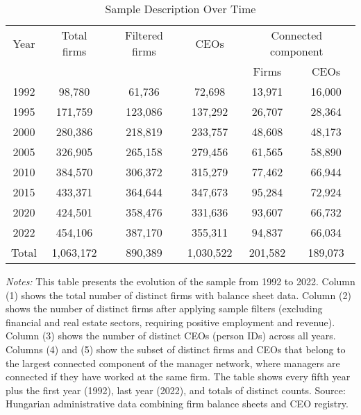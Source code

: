 \begin{table}[htbp]
\centering
\caption{Sample Description Over Time}
\label{tab:sample}
\begin{tabular}{*{6}{c}}
\toprule
Year & Total firms & Filtered firms & CEOs & \multicolumn{2}{c}{Connected component} \\
\cmidrule(lr){5-6}
 & & & & Firms & CEOs \\
\midrule
1992 &       98,780 &       61,736 &       72,698 &       13,971 &       16,000 \\
1995 &      171,759 &      123,086 &      137,292 &       26,707 &       28,364 \\
2000 &      280,386 &      218,819 &      233,757 &       48,608 &       48,173 \\
2005 &      326,905 &      265,158 &      279,456 &       61,565 &       58,890 \\
2010 &      384,570 &      306,372 &      315,279 &       77,462 &       66,944 \\
2015 &      433,371 &      364,644 &      347,673 &       95,284 &       72,924 \\
2020 &      424,501 &      358,476 &      331,636 &       93,607 &       66,732 \\
2022 &      454,106 &      387,170 &      355,311 &       94,837 &       66,034 \\
\midrule
Total &    1,063,172 &      890,389 &    1,030,522 &      201,582 &      189,073 \\
\bottomrule
\end{tabular}
\begin{minipage}{\textwidth}
\footnotesize
\textit{Notes:} This table presents the evolution of the sample from 1992 to 2022. Column (1) shows the total number of distinct firms with balance sheet data. Column (2) shows the number of distinct firms after applying sample filters (excluding financial and real estate sectors, requiring positive employment and revenue). Column (3) shows the number of distinct CEOs (person IDs) across all years. Columns (4) and (5) show the subset of distinct firms and CEOs that belong to the largest connected component of the manager network, where managers are connected if they have worked at the same firm. The table shows every fifth year plus the first year (1992), last year (2022), and totals of distinct counts. Source: Hungarian administrative data combining firm balance sheets and CEO registry.
\end{minipage}
\end{table}
